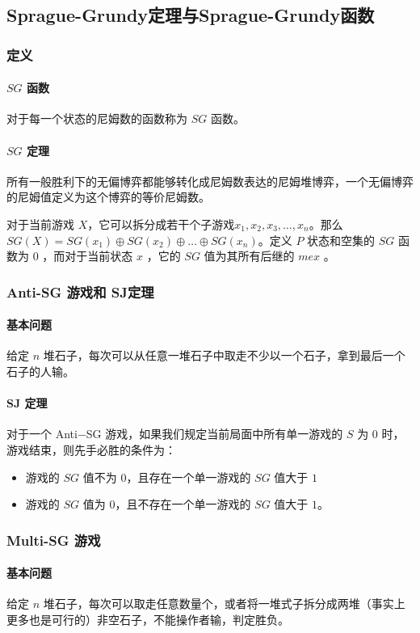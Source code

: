 \documentclass[UTF-8]{ctexart}
\begin{document}
		\subsection{Sprague-Grundy定理与Sprague-Grundy函数}
			\subsubsection{定义}
			\paragraph{$SG$ 函数} 对于每一个状态的尼姆数的函数称为 $SG$ 函数。
			\paragraph{$SG$ 定理} 所有一般胜利下的无偏博弈都能够转化成尼姆数表达的尼姆堆博弈，一个无偏博弈的尼姆值定义为这个博弈的等价尼姆数。
			
			对于当前游戏 $X$，它可以拆分成若干个子游戏$x_1,x_2,x_3,\dots,x_n$。那么$SG(X)=SG(x_1)\oplus SG(x_2)\oplus\dots\oplus SG(x_n)$。定义 $P$ 状态和空集的 $SG$ 函数为 $0$ ，而对于当前状态 $x$ ，它的 $SG$ 值为其所有后继的 $mex$ 。
			\subsubsection{Anti-SG 游戏和 SJ定理}
			\paragraph{基本问题}给定 $n$ 堆石子，每次可以从任意一堆石子中取走不少以一个石子，拿到最后一个石子的人输。
			\paragraph{SJ 定理} 对于一个 Anti−SG 游戏，如果我们规定当前局面中所有单一游戏的 $S$ 为 $0$ 时，游戏结束，则先手必胜的条件为：
			\begin{itemize}
				\item 游戏的 $SG$ 值不为 $0$，且存在一个单一游戏的 $SG$ 值大于 $1$
				\item 游戏的 $SG$ 值为 $0$，且不存在一个单一游戏的 $SG$ 值大于 $1$。
			\end{itemize}
			\subsubsection{Multi-SG 游戏}
			\paragraph{基本问题} 给定 $n$ 堆石子，每次可以取走任意数量个，或者将一堆式子拆分成两堆（事实上更多也是可行的）非空石子，不能操作者输，判定胜负。
\end{document}
